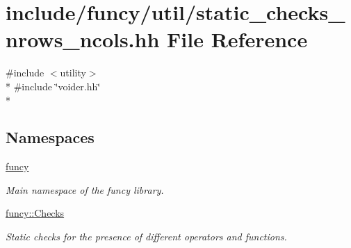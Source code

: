 \hypertarget{static__checks__nrows__ncols_8hh}{\section{include/funcy/util/static\-\_\-checks\-\_\-nrows\-\_\-ncols.hh File Reference}
\label{static__checks__nrows__ncols_8hh}
}
{\ttfamily \#include $<$utility$>$}\\*
{\ttfamily \#include \char`\"{}voider.\-hh\char`\"{}}\\*
\subsection*{Namespaces}
\begin{DoxyCompactItemize}
\item 
\hyperlink{namespacefuncy}{funcy}
\begin{DoxyCompactList}\small\item\em Main namespace of the funcy library. \end{DoxyCompactList}\item 
\hyperlink{namespacefuncy_1_1Checks}{funcy\-::\-Checks}
\begin{DoxyCompactList}\small\item\em Static checks for the presence of different operators and functions. \end{DoxyCompactList}\end{DoxyCompactItemize}
